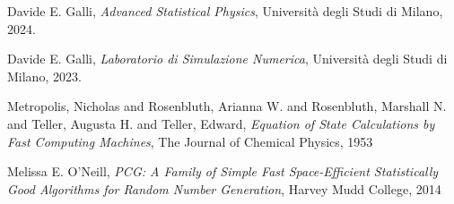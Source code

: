 \begin{thebibliography}{9}
     Davide E. Galli, \textit{Advanced Statistical Physics}, Università degli Studi di Milano, 2024.

     Davide E. Galli, \textit{Laboratorio di Simulazione Numerica}, Università degli Studi di Milano, 2023.

     Metropolis, Nicholas and Rosenbluth, Arianna W. and Rosenbluth, Marshall N. and Teller, Augusta H. and Teller, Edward,
    \textit{Equation of State Calculations by Fast Computing Machines}, The Journal of Chemical Physics, 1953

     Melissa E. O'Neill, \textit{PCG: A Family of Simple Fast Space-Efficient Statistically Good Algorithms for Random Number Generation}, 
    Harvey Mudd College, 2014

\end{thebibliography}